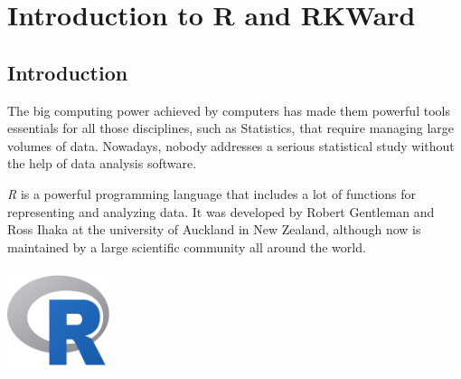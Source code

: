 
\chapter{Introduction to R and RKWard}\label{cha:introduction}

\section{Introduction}
The big computing power achieved by computers has made them powerful tools essentials for all those disciplines, such as
Statistics, that require managing large volumes of data.
Nowadays, nobody addresses a serious statistical study without the help of data analysis software. 

\emph{R} is a powerful programming language that includes a lot of functions for representing and analyzing data. 
It was developed by Robert Gentleman and Ross Ihaka at the university of Auckland in New Zealand, although now is
maintained by a large scientific community all around the world.

\begin{center}
\includegraphics[width=3cm]{chapters/introduction/img/Rlogo}
\end{center} 

